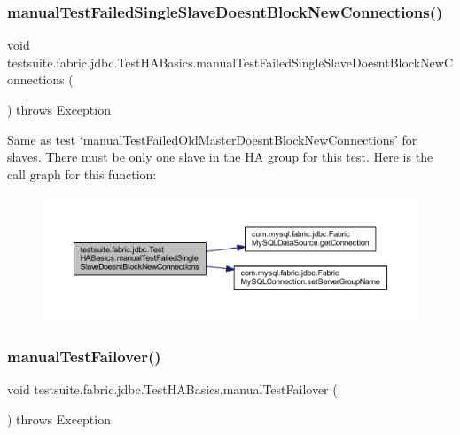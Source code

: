 \subsubsection{\texorpdfstring{manual\+Test\+Failed\+Single\+Slave\+Doesnt\+Block\+New\+Connections()}{manualTestFailedSingleSlaveDoesntBlockNewConnections()}}
{\footnotesize\ttfamily void testsuite.\+fabric.\+jdbc.\+Test\+H\+A\+Basics.\+manual\+Test\+Failed\+Single\+Slave\+Doesnt\+Block\+New\+Connections (\begin{DoxyParamCaption}{ }\end{DoxyParamCaption}) throws Exception}

Same as test `manual\+Test\+Failed\+Old\+Master\+Doesnt\+Block\+New\+Connections' for slaves. There must be only one slave in the HA group for this test. Here is the call graph for this function\+:
\nopagebreak
\begin{figure}[H]
\begin{center}
\leavevmode
\includegraphics[width=350pt]{classtestsuite_1_1fabric_1_1jdbc_1_1_test_h_a_basics_a8f2267e44add804694f5e99500bdc455_cgraph}
\end{center}
\end{figure}
\mbox{\label{classtestsuite_1_1fabric_1_1jdbc_1_1_test_h_a_basics_ad06678b5e9617e9471be5b2e4d4f1699}} 
\subsubsection{\texorpdfstring{manual\+Test\+Failover()}{manualTestFailover()}}
{\footnotesize\ttfamily void testsuite.\+fabric.\+jdbc.\+Test\+H\+A\+Basics.\+manual\+Test\+Failover (\begin{DoxyParamCaption}{ }\end{DoxyParamCaption}) throws Exception}

